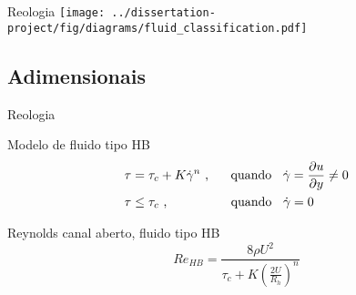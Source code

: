 \begin{frame}{Reologia}
    \texttt{[image: ../dissertation-project/fig/diagrams/fluid\_classification.pdf]}
\end{frame}


\subsection{Adimensionais}

\begin{frame}{Reologia}

    \begin{exampleblock}{Modelo de fluido tipo HB}
        \begin{equation}
            \label{eq:HB_shear_stress}
            \begin{split}
                \tau &= \tau_c + K \dot{\gamma}^n
                \text{ ,\hspace{0.5 cm} quando \hspace{0.2cm}} \dot{\gamma} = \frac{\partial u}{\partial y} \ne 0
                \\
                \tau &\leq \tau_c
                \text{ ,\hspace{1.65cm} quando \hspace{0.2cm}} \dot{\gamma} = 0
            \end{split}
        \end{equation}
    \end{exampleblock}

    \begin{exampleblock}{Reynolds canal aberto, fluido tipo HB}
        \begin{equation}
            Re_{HB} = \frac{8 \rho U^2}{\tau_c + K \left( \frac{2U}{R_h} \right)^n}
        \end{equation}
    \end{exampleblock}

\end{frame}

